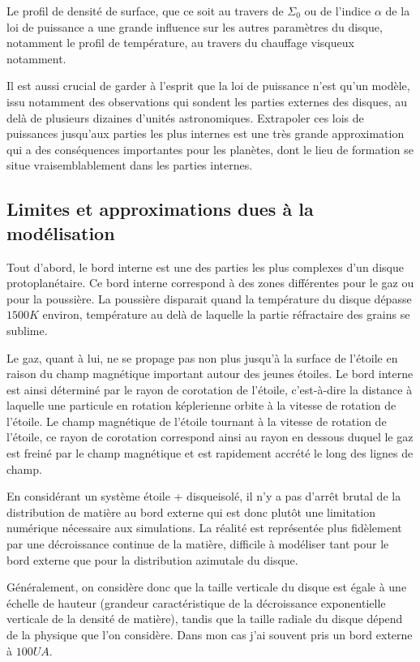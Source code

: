 Le profil de densité de surface, que ce soit au travers de $\Sigma_0$ ou de l'indice $\alpha$ de la loi de puissance a une grande influence sur les autres paramètres du disque, notamment le profil de température, au travers du chauffage visqueux notamment. 

Il est aussi crucial de garder à l'esprit que la loi de puissance n'est qu'un modèle, issu notamment des observations qui sondent les parties externes des disques, au delà de plusieurs dizaines d'unités astronomiques. Extrapoler ces lois de puissances jusqu'aux parties les plus internes est une très grande approximation qui a des conséquences importantes pour les planètes, dont le lieu de formation se situe vraisemblablement dans les parties internes.

\subsection{Limites et approximations dues à la modélisation}
Tout d'abord, le bord interne est une des parties les plus complexes d'un disque protoplanétaire. Ce bord interne correspond à des zones différentes pour le gaz ou pour la poussière. La poussière disparait quand la température du disque dépasse $1500\unit{K}$ environ, température au delà de laquelle la partie réfractaire des grains se sublime. 

Le gaz, quant à lui, ne se propage pas non plus jusqu'à la surface de l'étoile en raison du champ magnétique important autour des jeunes étoiles. Le bord interne est ainsi déterminé par le rayon de corotation de l'étoile, c'est-à-dire la distance à laquelle une particule en rotation képlerienne orbite à la vitesse de rotation de l'étoile. Le champ magnétique de l'étoile tournant à la vitesse de rotation de l'étoile, ce rayon de corotation correspond ainsi au rayon en dessous duquel le gaz est freiné par le champ magnétique et est rapidement accrété le long des lignes de champ. 

\bigskip

En considérant un système \og étoile + disque\fg isolé, il n'y a pas d'arrêt brutal de la distribution de matière au bord externe qui est donc plutôt une limitation numérique nécessaire aux simulations. La réalité est représentée plus fidèlement par une décroissance continue de la matière, difficile à modéliser tant pour le bord externe que pour la distribution azimutale du disque. 

Généralement, on considère donc que la taille verticale du disque est égale à une échelle de hauteur (grandeur caractéristique de la décroissance exponentielle verticale de la densité de matière), tandis que la taille radiale du disque dépend de la physique que l'on considère. Dans mon cas j'ai souvent pris un bord externe à $100\unit{UA}$.

